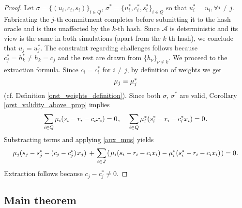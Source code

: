 \documentclass[10pt, psamsfonts, reqno]{amsart}
\theoremstyle{definition}
\theoremstyle{remark}
\numberwithin{equation}{section}
\begin{document}
\begin{proof}
Let $\sigma = \{(u_i, c_i, s_i)\}_{i \in Q}$,
$\sigma^* = \{u_i^*, c_i^*, s_i^*\}_{i \in Q}$ so that
$u_i^* = u_i,\forall i \neq j$.
Fabricating the $j$-th commitment completes
before submitting it to the hash oracle
and is thus unaffected by the $k$-th hash.
Since $\mathcal{A}$ is deterministic and its view is
the same in both simulations (apart from the $k$-th hash),
we conclude that $u_j = u_j^*$.
The constraint regarding challenges follows because
$c_j^* = h_k^* \neq h_k = c_j$
and the rest are drawn from $\{h_\nu\}_{\nu \neq k}$.
We proceed to the extraction formula.
Since $c_i = c^*_i$ for $i \neq j$,
by definition of weights we get
\vspace{2pt}
\begin{equation}\label{aux_mus}
\mu_j = \mu^*_j
\vspace{2pt}
\end{equation}
(cf. Definition \ref{orst_weights_definition}).
Since both $\sigma$, $\sigma^*$ are valid, Corollary
\ref{orst_validity_above_prop} implies
\vspace{5pt}
\begin{equation*}
\sum_{i \in Q} \mu_i (s_i - r_i - c_i x_i) = 0\hspace{1pt},
\hspace{12pt}
\sum_{i \in Q} \mu_i^* (s_i^* - r_i - c_i^* x_i) = 0\hspace{1pt}.
\vspace{5pt}
\end{equation*}
Substracting terms and applying \eqref{aux_mus} yields
\vspace{5pt}
\begin{equation*}
\mu_j (s_j - s_j^* - (c_j - c_j^*)\hspace{1pt} x_j)
\hspace{2pt}
+
\hspace{1pt}
\sum_{i \in J}\hspace{1pt}
(
\hspace{1pt}
\mu_i (s_i - r_i - c_i x_i)
-
\mu_i^* (s_i^* - r_i - c_i x_i)
\hspace{1pt}
)
=
0\hspace{1pt}.
\vspace{5pt}
\end{equation*}
Extraction follows because $c_j - c_j^* \neq 0$.
\vspace{0pt}
\end{proof}

\subsection{Main theorem}\label{section_main_theorem}
\end{document}
